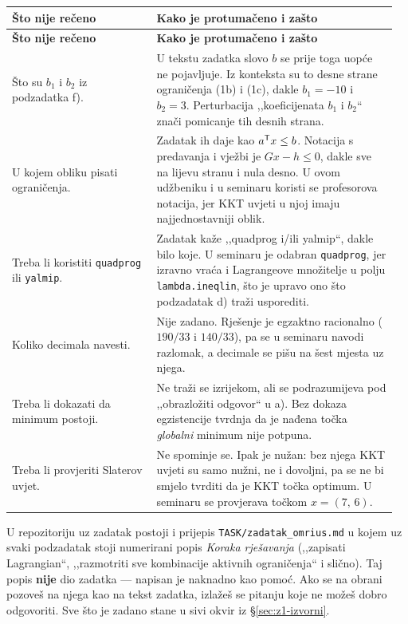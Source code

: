 \begin{longtable}{@{}p{0.36\linewidth} p{0.60\linewidth}@{}}
\toprule
\textbf{Što nije rečeno} & \textbf{Kako je protumačeno i zašto} \\
\midrule
\endfirsthead
\toprule
\textbf{Što nije rečeno} & \textbf{Kako je protumačeno i zašto} \\
\midrule
\endhead
Što su $b_1$ i $b_2$ iz podzadatka f). & U tekstu zadatka slovo $b$ se prije toga
uopće ne pojavljuje. Iz konteksta su to desne strane ograničenja (1b) i (1c),
dakle $b_1 = -10$ i $b_2 = 3$. Perturbacija ,,koeficijenata $b_1$ i $b_2$``
znači pomicanje tih desnih strana. \\[6pt]
U kojem obliku pisati ograničenja. & Zadatak ih daje kao $a^{\mathsf{T}} x \leq b$.
Notacija s predavanja i vježbi je $Gx - h \leq 0$, dakle sve na lijevu stranu i
nula desno. U ovom udžbeniku i u seminaru koristi se profesorova notacija, jer
KKT uvjeti u njoj imaju najjednostavniji oblik. \\[6pt]
Treba li koristiti \texttt{quadprog} ili \texttt{yalmip}. & Zadatak kaže
,,quadprog i/ili yalmip``, dakle bilo koje. U seminaru je odabran
\texttt{quadprog}, jer izravno vraća i Lagrangeove množitelje u polju
\texttt{lambda.ineqlin}, što je upravo ono što podzadatak d) traži usporediti. \\[6pt]
Koliko decimala navesti. & Nije zadano. Rješenje je egzaktno racionalno
($190/33$ i $140/33$), pa se u seminaru navodi razlomak, a decimale se pišu na
šest mjesta uz njega. \\[6pt]
Treba li dokazati da minimum postoji. & Ne traži se izrijekom, ali se
podrazumijeva pod ,,obrazložiti odgovor`` u a). Bez dokaza egzistencije tvrdnja
da je nađena točka \emph{globalni} minimum nije potpuna. \\[6pt]
Treba li provjeriti Slaterov uvjet. & Ne spominje se. Ipak je nužan: bez njega
KKT uvjeti su samo nužni, ne i dovoljni, pa se ne bi smjelo tvrditi da je
KKT točka optimum. U seminaru se provjerava točkom $x = (7,\,6)$. \\
\bottomrule
\end{longtable}

\begin{zamka}
U repozitoriju uz zadatak postoji i prijepis \texttt{TASK/zadatak\_omrius.md} u
kojem uz svaki podzadatak stoji numerirani popis \emph{Koraka rješavanja}
(,,zapisati Lagrangian``, ,,razmotriti sve kombinacije aktivnih ograničenja`` i
slično). Taj popis \textbf{nije} dio zadatka --- napisan je naknadno kao pomoć.
Ako se na obrani pozoveš na njega kao na tekst zadatka, izlažeš se pitanju koje
ne možeš dobro odgovoriti. Sve što je zadano stane u sivi okvir iz
\S\ref{sec:z1-izvorni}.
\end{zamka}

